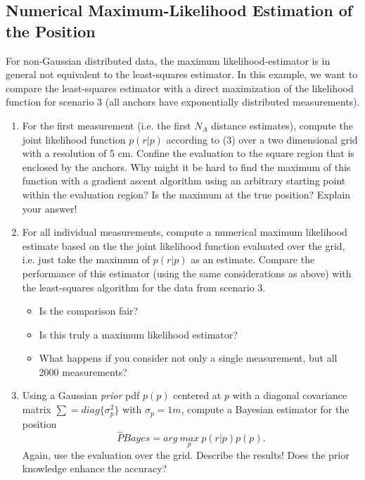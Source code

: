\documentclass[a4paper]{article}
\begin{document}
\subsection{Numerical Maximum-Likelihood Estimation of the Position}
For non-Gaussian distributed data, the maximum likelihood-estimator is in general not equivalent to the least-squares estimator. In this example, we want to compare the least-squares estimator with a direct maximization of the likelihood function for scenario 3 (all anchors have exponentially distributed measurements).

\begin{enumerate}
\item  For the first measurement (i.e. the first $N_A$ distance estimates), compute the joint likelihood function $p(r|p)$ according to (3) over a two dimensional grid with a resolution of 5 cm. Confine the evaluation to the square region that is enclosed by the anchors. Why might it be hard to find the maximum of this function with a gradient ascent algorithm using an arbitrary starting point within the evaluation region?\newline
Is the maximum at the true position? Explain your answer!
\item For all individual measurements, compute a numerical maximum likelihood estimate based on the the joint likelihood function evaluated over the grid, i.e. just take the maximum of $p(r|p)$ as an estimate. Compare the performance of this estimator (using the same considerations as above) with the least-squares algorithm for the data from scenario 3.

\begin{itemize}
\item Is the comparison fair?
\item Is this truly a maximum likelihood estimator?
\item What happens if you consider not only a single measurement, but all 2000 measurements?
\end{itemize}

\item  Using a Gaussian \textit{prior} pdf $p(p)$ centered at $p$ with a diagonal covariance matrix $\sum = diag \{ \sigma^2_p \}$ with $\sigma_p = 1m$, compute a Bayesian estimator for the position
\[
\hat{P}Bayes = arg ~\underset{p}{max} ~p(r|p)p(p).
\]
Again, use the evaluation over the grid. Describe the results! Does the prior knowledge enhance the accuracy?
\end{enumerate}
\end{document}
